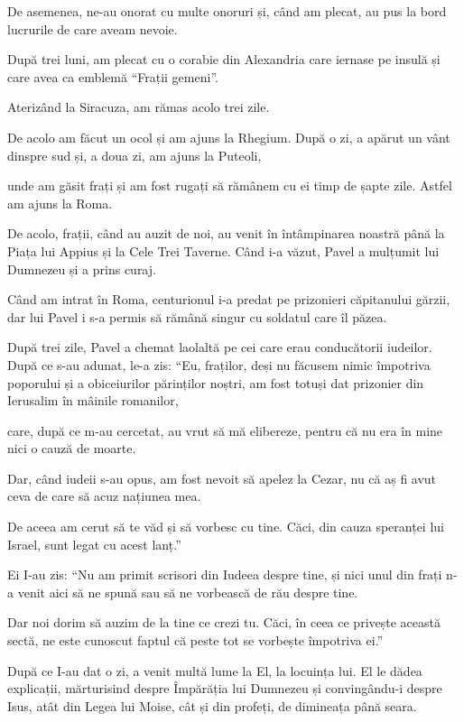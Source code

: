 {De asemenea, ne-au onorat cu multe onoruri și, când am plecat, au pus la bord lucrurile de care aveam nevoie.


\par }{\PP {}După trei luni, am plecat cu o corabie din Alexandria care iernase pe insulă și care avea ca emblemă “Frații gemeni”.

Aterizând la Siracuza, am rămas acolo trei zile.

De acolo am făcut un ocol și am ajuns la Rhegium. După o zi, a apărut un vânt dinspre sud și, a doua zi, am ajuns la Puteoli,

unde am găsit frați și am fost rugați să rămânem cu ei timp de șapte zile. Astfel am ajuns la Roma.

De acolo, frații, când au auzit de noi, au venit în întâmpinarea noastră până la Piața lui Appius și la Cele Trei Taverne. Când i-a văzut, Pavel a mulțumit lui Dumnezeu și a prins curaj.

Când am intrat în Roma, centurionul i-a predat pe prizonieri căpitanului gărzii, dar lui Pavel i s-a permis să rămână singur cu soldatul care îl păzea.


\par }{\PP {}După trei zile, Pavel a chemat laolaltă pe cei care erau conducătorii iudeilor. După ce s-au adunat, le-a zis: “Eu, fraților, deși nu făcusem nimic împotriva poporului și a obiceiurilor părinților noștri, am fost totuși dat prizonier din Ierusalim în mâinile romanilor,

care, după ce m-au cercetat, au vrut să mă elibereze, pentru că nu era în mine nici o cauză de moarte.

Dar, când iudeii s-au opus, am fost nevoit să apelez la Cezar, nu că aș fi avut ceva de care să acuz națiunea mea.

De aceea am cerut să te văd și să vorbesc cu tine. Căci, din cauza speranței lui Israel, sunt legat cu acest lanț.”


\par }{\PP {}Ei I-au zis: “Nu am primit scrisori din Iudeea despre tine, și nici unul din frați n-a venit aici să ne spună sau să ne vorbească de rău despre tine.

Dar noi dorim să auzim de la tine ce crezi tu. Căci, în ceea ce privește această sectă, ne este cunoscut faptul că peste tot se vorbește împotriva ei.”


\par }{\PP {}După ce I-au dat o zi, a venit multă lume la El, la locuința lui. El le dădea explicații, mărturisind despre Împărăția lui Dumnezeu și convingându-i despre Isus, atât din Legea lui Moise, cât și din profeți, de dimineața până seara.

}
